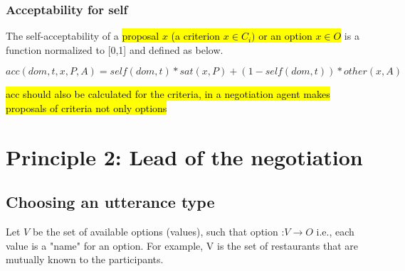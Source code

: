 \documentclass{article}
\begin{document}
	\subsubsection{Acceptability for self}

	The self-acceptability of a \hl{proposal $x$ (a criterion $x \in C_i)$ or an option $x  \in O$} is a function normalized to [0,1] and defined as below.

	$$acc(dom, t, x, P, A) = self(dom, t) * sat(x, P)+ (1 - self(dom, t)) * other(x, A)$$

	\hl{acc should also be calculated for the criteria, in a negotiation agent makes proposals of criteria not only options}
	
	
	\section{Principle 2: Lead of the negotiation}
%	
	
%	
%	
%		
	
	\subsection{Choosing an utterance type}
		
		Let $V$ be the set of available options (values), such that option :$ V\rightarrow O$	i.e., each value is a "name" for an option.  For example, V is the set of restaurants that are mutually known to the participants. 
	
\end{document}

